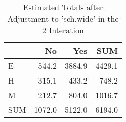 \begin{table}[ht]
\centering
\caption{Estimated Totals after Adjustment to 'sch.wide' in the 2 Interation} 
\begin{tabular}{l|rr|r}
  & No & Yes & SUM \\ 
  \hline
E & 544.2 & 3884.9 & 4429.1 \\ 
  H & 315.1 & 433.2 & 748.2 \\ 
  M & 212.7 & 804.0 & 1016.7 \\ 
   \hline
SUM & 1072.0 & 5122.0 & 6194.0 \\ 
  \end{tabular}
\end{table}
